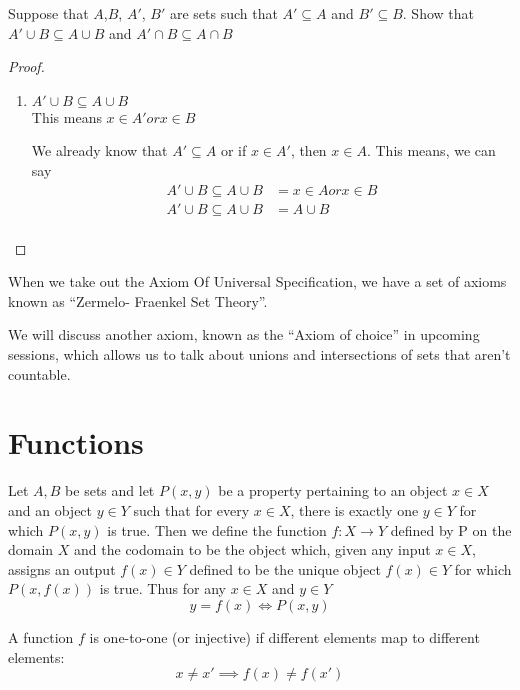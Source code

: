 \documentclass[11pt]{report}
\begin{document}
\begin{prop}
	Suppose that $A$,$B$, $A'$, $B'$ are sets such that $A\prime \subseteq A$ and $B' \subseteq B$. Show that $A' \cup B \subseteq A \cup B$ and $A' \cap B \subseteq A \cap B$
\end{prop}
\begin{proof}
	\begin{enumerate}
		\item $A' \cup B \subseteq A \cup B$ \\

		This means $x \in A' or x \in  B$

		We already know that $A' \subseteq A$ or if $x \in A'$, then $x \in A$. This means, we can say
		\begin{align*}
			A' \cup B \subseteq A \cup B & =	x \in A or x \in B \\
			A' \cup B \subseteq A \cup B & = A \cup B           \\
		\end{align*}

	\end{enumerate}
\end{proof}


When we take out the Axiom Of Universal Specification, we have a set of axioms known as ``Zermelo- Fraenkel Set Theory''.

We will discuss another axiom, known as the ``Axiom of choice'' in upcoming sessions, which allows us to talk about unions and intersections of sets that aren't countable.
\section{Functions}

\begin{definition}[Functions]
	Let $A,B$ be sets and let $P(x,y)$ be a property pertaining to an object $x \in X$ and an object $y \in Y$ such that for every $x \in X$, there is exactly one $y \in Y$ for which $P(x,y)$ is true. Then we define the function $f:X  \rightarrow Y$ defined by P on the domain $X$ and the codomain to be the object which, given any input $x \in X$, assigns an output $f(x) \in Y$ defined to be the unique object $f(x) \in Y$ for which $P(x, f(x))$ is true. Thus for any $x \in X$ and $y \in Y$
	\[
		y = f(x) \Leftrightarrow P(x,y)
	\]
\end{definition}

\begin{definition}
	A function $f$ is one-to-one (or injective) if different elements map to different elements:
	\[
		x \ne x' \implies f(x) \ne f(x')
	\]
\end{definition}
\end{document}
